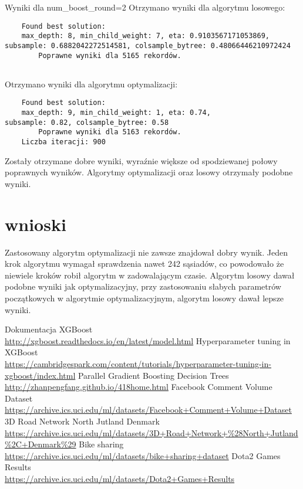 \documentclass[a4paper,12p]{article}
\begin{document}
	Wyniki dla num_boost_round=2
	Otrzymano wyniki dla algorytmu losowego:
	\begin{verbatim}
	Found best solution:
	max_depth: 8, min_child_weight: 7, eta: 0.9103567171053869,
subsample: 0.6882042272514581, colsample_bytree: 0.48066446210972424
        Poprawne wyniki dla 5165 rekordów.
	
	\end{verbatim}Otrzymano wyniki dla algorytmu optymalizacji:
	\begin{verbatim}
	Found best solution:
	max_depth: 9, min_child_weight: 1, eta: 0.74,
subsample: 0.82, colsample_bytree: 0.58
        Poprawne wyniki dla 5163 rekordów.
	Liczba iteracji: 900
	\end{verbatim}
	
	Zostały otrzymane dobre wyniki, wyraźnie większe od spodziewanej połowy poprawnych wyników. Algorytmy optymalizacji oraz losowy otrzymały podobne wyniki.  
	
	\section{wnioski}
	Zastosowany algorytm optymalizacji nie zawsze znajdował dobry wynik. Jeden krok algorytmu wymagał sprawdzenia nawet 242 sąsiadów, co powodowało że niewiele kroków robił algorytm w zadowalającym czasie. Algorytm losowy dawał podobne wyniki jak optymalizacyjny, przy zastosowaniu słabych parametrów początkowych w algorytmie optymalizacyjnym, algorytm losowy dawał lepsze wyniki.
	
\begin{thebibliography}{1}
 Dokumentacja XGBoost \\ \url{http://xgboost.readthedocs.io/en/latest/model.html}
 Hyperparameter tuning in XGBoost \\ \url{https://cambridgespark.com/content/tutorials/hyperparameter-tuning-in-xgboost/index.html}
 Parallel Gradient Boosting Decision Trees \\ \url{http://zhanpengfang.github.io/418home.html}
 Facebook Comment Volume Dataset \\ \url{https://archive.ics.uci.edu/ml/datasets/Facebook+Comment+Volume+Dataset}
 3D Road Network North Jutland Denmark \\ \url{https://archive.ics.uci.edu/ml/datasets/3D+Road+Network+%28North+Jutland%2C+Denmark%29}
 Bike sharing \\ \url{https://archive.ics.uci.edu/ml/datasets/bike+sharing+dataset}
 Dota2 Games Results \\ \url{https://archive.ics.uci.edu/ml/datasets/Dota2+Games+Results}

\end{thebibliography}	
	
\end{document}
